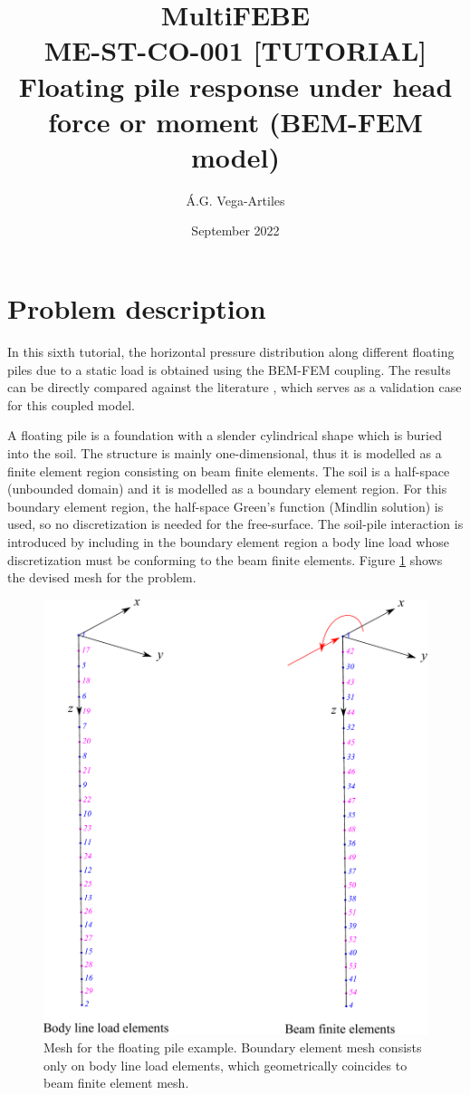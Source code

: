 \documentclass[a4]{article}
\title{MultiFEBE \\ ME-ST-CO-001 [TUTORIAL] \\ Floating pile response under head force or moment (BEM-FEM model)}
\author{\'A.G. Vega-Artiles}
\date{September 2022}
\begin{document}
\maketitle

\tableofcontents 

\section{Problem description}

In this sixth tutorial, the horizontal pressure distribution along different floating piles due to a static load is obtained using the BEM-FEM coupling. The results can be directly compared against the literature \cite{poulos}, which serves as a validation case for this coupled model.

A floating pile is a foundation with a slender cylindrical shape which is buried into the soil. The structure is mainly one-dimensional, thus it is modelled as a finite element region consisting on beam finite elements. The soil is a half-space (unbounded domain) and it is modelled as a boundary element region. For this boundary element region, the half-space Green's function (Mindlin solution) is used, so no discretization is needed for the free-surface. The soil-pile interaction is introduced by including in the boundary element region a body line load whose discretization must be conforming to the beam finite elements. Figure \ref{fig:layout} shows the devised mesh for the problem.

\begin{figure}[tbh!]
	\centering
	\includegraphics[scale=0.4]{floating.pdf}
	\caption{Mesh for the floating pile example. Boundary element mesh consists only on body line load elements, which geometrically coincides to beam finite element mesh.}
	\label{fig:layout}
\end{figure}
\end{document}
